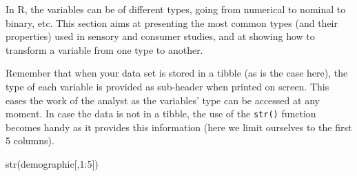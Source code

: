 \documentclass[
]{krantz}
\makeatletter
\newenvironment{Shaded}{\begin{snugshade}}{\end{snugshade}}
\newcommand{\AttributeTok}[1]{\textcolor[rgb]{0.61,0.61,0.61}{#1}}
\newcommand{\DecValTok}[1]{\textcolor[rgb]{0.06,0.06,0.06}{#1}}
\newcommand{\FunctionTok}[1]{\textcolor[rgb]{0,0,0}{#1}}
\newcommand{\NormalTok}[1]{#1}
\newcommand{\OtherTok}[1]{\textcolor[rgb]{0.37,0.37,0.37}{#1}}
\newcommand{\SpecialCharTok}[1]{\textcolor[rgb]{0,0,0}{#1}}
\newcommand{\StringTok}[1]{\textcolor[rgb]{0.5,0.5,0.5}{#1}}
\newenvironment{kframe}{%
\medskip{}
\setlength{\fboxsep}{.8em}
 \def\at@end@of@kframe{}%
 \ifinner\ifhmode%
  \def\at@end@of@kframe{\end{minipage}}%
  \begin{minipage}{\columnwidth}%
 \fi\fi%
 \def\FrameCommand##1{\hskip\@totalleftmargin \hskip-\fboxsep
 \colorbox{shadecolor}{##1}\hskip-\fboxsep
     \hskip-\linewidth \hskip-\@totalleftmargin \hskip\columnwidth}%
 \MakeFramed {\advance\hsize-\width
   \@totalleftmargin\z@ \linewidth\hsize
   \@setminipage}}%
 {\par\unskip\endMakeFramed%
 \at@end@of@kframe}
\renewenvironment{Shaded}{\begin{kframe}}{\end{kframe}}
\makeatother
\begin{document}
\begin{Shaded}
\end{Shaded}

In R, the variables can be of different types, going from numerical to nominal to binary, etc. This section aims at presenting the most common types (and their properties) used in sensory and consumer studies, and at showing how to transform a variable from one type to another.

Remember that when your data set is stored in a tibble (as is the case here), the type of each variable is provided as sub-header when printed on screen. This eases the work of the analyst as the variables' type can be accessed at any moment. In case the data is not in a tibble, the use of the \texttt{str()} function becomes handy as it provides this information (here we limit ourselves to the first 5 columns).

\begin{Shaded}
\begin{Highlighting}[]
\FunctionTok{str}\NormalTok{(demographic[,}\DecValTok{1}\SpecialCharTok{:}\DecValTok{5}\NormalTok{])}
\end{Highlighting}
\end{Shaded}
\end{document}
